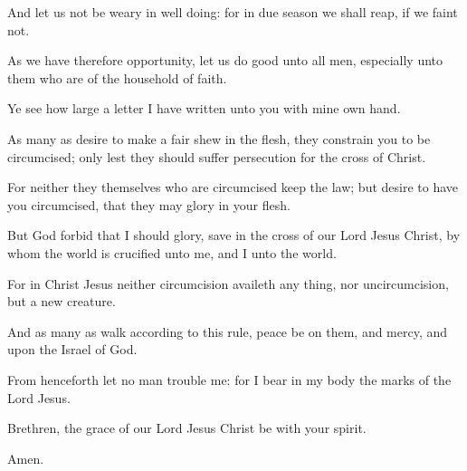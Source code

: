 \verse And let us not be weary in well doing: for in due season we shall reap, if we faint not.

\verse As we have therefore opportunity, let us do good unto all men, especially unto them who are of the household of faith.

\verse Ye see how large a letter I have written unto you with mine own hand.

\verse As many as desire to make a fair shew in the flesh, they constrain you to be circumcised; only lest they should suffer persecution for the cross of Christ.

\verse For neither they themselves who are circumcised keep the law; but desire to have you circumcised, that they may glory in your flesh.

\verse But God forbid that I should glory, save in the cross of our Lord Jesus Christ, by whom the world is crucified unto me, and I unto the world.

\verse For in Christ Jesus neither circumcision availeth any thing, nor uncircumcision, but a new creature.

\verse And as many as walk according to this rule, peace be on them, and mercy, and upon the Israel of God.

\verse From henceforth let no man trouble me: for I bear in my body the marks of the Lord Jesus.

\verse Brethren, the grace of our Lord Jesus Christ be with your spirit.

Amen.

